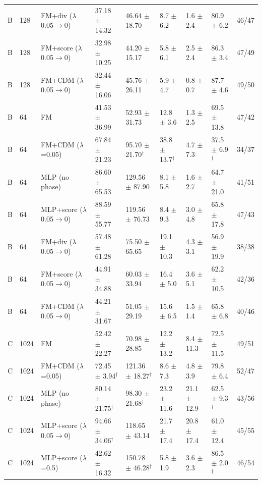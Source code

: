 \begin{tabular}{lllllllll}
B & 128 & FM+div ($\lambda$ 0.05$\to$0) & 37.18 $\pm$ 14.32 & 46.64 $\pm$ 18.70 & 8.7 $\pm$ 6.2 & 1.6 $\pm$ 2.4 & 80.9 $\pm$ 6.2 & 46/47 \\
B & 128 & FM+score ($\lambda$ 0.05$\to$0) & 32.98 $\pm$ 10.25 & 44.20 $\pm$ 15.17 & 5.8 $\pm$ 6.1 & 2.5 $\pm$ 2.4 & 86.3 $\pm$ 3.4 & 47/49 \\
B & 128 & FM+CDM ($\lambda$ 0.05$\to$0) & 32.44 $\pm$ 16.06 & 45.76 $\pm$ 26.11 & 5.9 $\pm$ 4.7 & 0.8 $\pm$ 0.7 & 87.7 $\pm$ 4.6 & 49/50 \\
B & 64 & FM & 41.53 $\pm$ 36.99 & 52.93 $\pm$ 31.73 & 12.8 $\pm$ 3.6 & 1.3 $\pm$ 2.5 & 69.5 $\pm$ 13.8 & 47/42 \\
B & 64 & FM+CDM ($\lambda$=0.05) & 67.84 $\pm$ 21.23 & 95.70 $\pm$ 21.70$^\dagger$ & 38.8 $\pm$ 13.7$^\dagger$ & 4.7 $\pm$ 7.3 & 37.5 $\pm$ 6.9$^\dagger$ & 34/37 \\
B & 64 & MLP (no phase) & 86.60 $\pm$ 65.53 & 129.56 $\pm$ 87.90 & 8.1 $\pm$ 5.8 & 1.6 $\pm$ 2.7 & 64.7 $\pm$ 21.0 & 41/51 \\
B & 64 & MLP+score ($\lambda$ 0.05$\to$0) & 88.59 $\pm$ 55.77 & 119.56 $\pm$ 76.73 & 8.4 $\pm$ 9.3 & 3.0 $\pm$ 4.8 & 65.8 $\pm$ 17.8 & 47/43 \\
B & 64 & FM+div ($\lambda$ 0.05$\to$0) & 57.48 $\pm$ 61.28 & 75.50 $\pm$ 65.65 & 19.1 $\pm$ 10.3 & 4.3 $\pm$ 3.1 & 56.9 $\pm$ 19.9 & 38/38 \\
B & 64 & FM+score ($\lambda$ 0.05$\to$0) & 44.91 $\pm$ 34.88 & 60.03 $\pm$ 33.94 & 16.4 $\pm$ 5.0 & 3.6 $\pm$ 5.1 & 62.2 $\pm$ 10.5 & 42/36 \\
B & 64 & FM+CDM ($\lambda$ 0.05$\to$0) & 44.21 $\pm$ 31.67 & 51.05 $\pm$ 29.19 & 15.6 $\pm$ 6.5 & 1.5 $\pm$ 1.4 & 65.8 $\pm$ 6.8 & 40/46 \\
\midrule
C & 1024 & FM & 52.42 $\pm$ 22.27 & 70.98 $\pm$ 28.85 & 12.2 $\pm$ 13.2 & 8.4 $\pm$ 11.3 & 72.5 $\pm$ 11.5 & 49/51 \\
C & 1024 & FM+CDM ($\lambda$=0.05) & 72.45 $\pm$ 3.94$^\dagger$ & 121.36 $\pm$ 18.27$^\dagger$ & 8.6 $\pm$ 7.3 & 4.8 $\pm$ 3.9 & 79.8 $\pm$ 6.4 & 52/47 \\
C & 1024 & MLP (no phase) & 80.14 $\pm$ 21.75$^\dagger$ & 98.30 $\pm$ 21.68$^\dagger$ & 23.2 $\pm$ 11.6 & 21.1 $\pm$ 12.9 & 62.5 $\pm$ 9.3$^\dagger$ & 43/56 \\
C & 1024 & MLP+score ($\lambda$ 0.05$\to$0) & 94.66 $\pm$ 34.06$^\dagger$ & 118.65 $\pm$ 43.14 & 21.7 $\pm$ 17.4 & 20.8 $\pm$ 17.4 & 61.0 $\pm$ 12.4 & 45/55 \\
C & 1024 & MLP+score ($\lambda$=0.5) & 42.62 $\pm$ 16.32 & 150.78 $\pm$ 46.28$^\dagger$ & 5.8 $\pm$ 1.9 & 3.6 $\pm$ 2.3 & 86.5 $\pm$ 2.0$^\dagger$ & 46/54 \\

\end{tabular}
